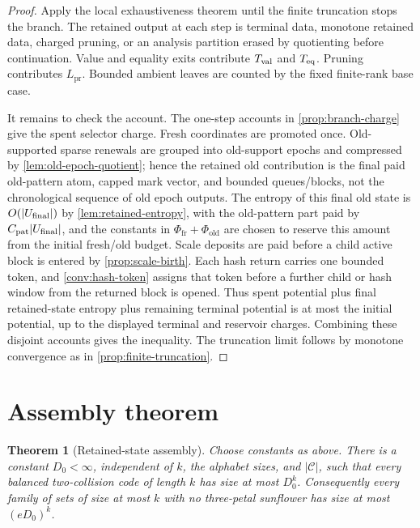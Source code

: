 \documentclass[11pt]{article}
\newcommand{\Cref}[1]{\ref{#1}}
\newtheorem{theorem}{Theorem}[section]
\theoremstyle{remark}
\newcommand{\C}{\mathcal C}
\newcommand{\pr}{\mathrm{pr}}
\newcommand{\old}{\mathrm{old}}
\newcommand{\fr}{\mathrm{fr}}
\begin{document}
\begin{proof}
Apply the local exhaustiveness theorem until the finite truncation stops the branch.  The retained output at each step is terminal data, monotone retained data, charged pruning, or an analysis partition erased by quotienting before continuation.  Value and equality exits contribute $T_{\rm val}$ and $T_{\rm eq}$.  Pruning contributes $L_{\pr}$.  Bounded ambient leaves are counted by the fixed finite-rank base case.

It remains to check the account.  The one-step accounts in \Cref{prop:branch-charge} give the spent selector charge.  Fresh coordinates are promoted once.  Old-supported sparse renewals are grouped into old-support epochs and compressed by \Cref{lem:old-epoch-quotient}; hence the retained old contribution is the final paid old-pattern atom, capped mark vector, and bounded queues/blocks, not the chronological sequence of old epoch outputs.  The entropy of this final old state is $O(|U_{\rm final}|)$ by \Cref{lem:retained-entropy}, with the old-pattern part paid by $C_{\rm pat}|U_{\rm final}|$, and the constants in $\Phi_{\fr}+\Phi_{\old}$ are chosen to reserve this amount from the initial fresh/old budget.  Scale deposits are paid before a child active block is entered by \Cref{prop:scale-birth}.  Each hash return carries one bounded token, and \Cref{conv:hash-token} assigns that token before a further child or hash window from the returned block is opened.  Thus spent potential plus final retained-state entropy plus remaining terminal potential is at most the initial potential, up to the displayed terminal and reservoir charges.  Combining these disjoint accounts gives the inequality.  The truncation limit follows by monotone convergence as in \Cref{prop:finite-truncation}.
\end{proof}

\section{Assembly theorem}\label{sec:assembly}

\begin{theorem}[Retained-state assembly]\label{thm:assembly}
Choose constants as above.  There is a constant $D_0<\infty$, independent of $k$, the alphabet sizes, and $|\C|$, such that every balanced two-collision code of length $k$ has size at most $D_0^k$.  Consequently every family of sets of size at most $k$ with no three-petal sunflower has size at most $(eD_0)^k$.
\end{theorem}
\end{document}

